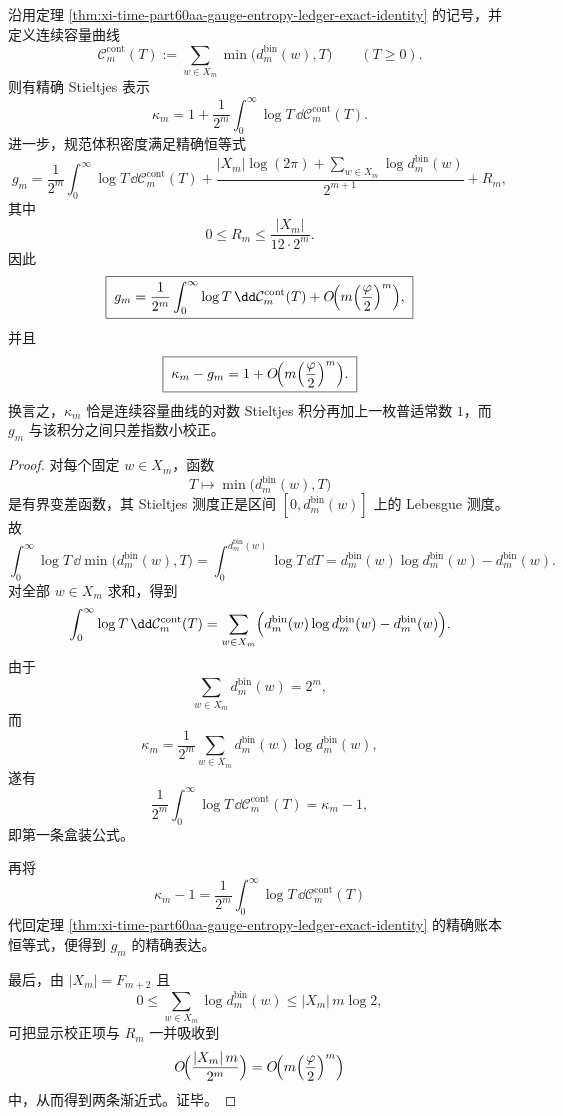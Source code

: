 \begin{theorem}\label{thm:xi-time-part60aa-log-stieltjes-capacity-gauge-density}
沿用定理 \ref{thm:xi-time-part60aa-gauge-entropy-ledger-exact-identity} 的记号，并定义连续容量曲线
\[
\mathcal C_m^{\mathrm{cont}}(T):=\sum_{w\in X_m}\min\bigl(d_m^{\mathrm{bin}}(w),T\bigr)
\qquad(T\ge 0).
\]
则有精确 Stieltjes 表示
\[
\boxed{\;
\kappa_m
=
1+\frac{1}{2^m}\int_0^\infty \log T\,\dd \mathcal C_m^{\mathrm{cont}}(T).\;}
\]
进一步，规范体积密度满足精确恒等式
\[
\boxed{\;
g_m
=
\frac{1}{2^m}\int_0^\infty \log T\,\dd \mathcal C_m^{\mathrm{cont}}(T)
+\frac{|X_m|\log(2\pi)+\sum_{w\in X_m}\log d_m^{\mathrm{bin}}(w)}{2^{m+1}}
+R_m,\;}
\]
其中
\[
0\le R_m\le \frac{|X_m|}{12\cdot 2^m}.
\]
因此
\[
\boxed{\;
g_m
=
\frac{1}{2^m}\int_0^\infty \log T\,\dd \mathcal C_m^{\mathrm{cont}}(T)
+O\!\Bigl(m\Bigl(\frac{\varphi}{2}\Bigr)^m\Bigr),\;}
\]
并且
\[
\boxed{\;
\kappa_m-g_m
=
1+O\!\Bigl(m\Bigl(\frac{\varphi}{2}\Bigr)^m\Bigr).\;}
\]
换言之，\(\kappa_m\) 恰是连续容量曲线的对数 Stieltjes 积分再加上一枚普适常数 \(1\)，而 \(g_m\) 与该积分之间只差指数小校正。
\end{theorem}
\begin{proof}
对每个固定 \(w\in X_m\)，函数
\[
T\longmapsto \min\bigl(d_m^{\mathrm{bin}}(w),T\bigr)
\]
是有界变差函数，其 Stieltjes 测度正是区间 \([0,d_m^{\mathrm{bin}}(w)]\) 上的 Lebesgue 测度。故
\[
\int_0^\infty \log T\,\dd\min\bigl(d_m^{\mathrm{bin}}(w),T\bigr)
=
\int_0^{d_m^{\mathrm{bin}}(w)}\log T\,\dd T
=
d_m^{\mathrm{bin}}(w)\log d_m^{\mathrm{bin}}(w)-d_m^{\mathrm{bin}}(w).
\]
对全部 \(w\in X_m\) 求和，得到
\[
\int_0^\infty \log T\,\dd\mathcal C_m^{\mathrm{cont}}(T)
=
\sum_{w\in X_m}
\Bigl(
d_m^{\mathrm{bin}}(w)\log d_m^{\mathrm{bin}}(w)-d_m^{\mathrm{bin}}(w)
\Bigr).
\]
由于
\[
\sum_{w\in X_m}d_m^{\mathrm{bin}}(w)=2^m,
\]
而
\[
\kappa_m=\frac{1}{2^m}\sum_{w\in X_m}d_m^{\mathrm{bin}}(w)\log d_m^{\mathrm{bin}}(w),
\]
遂有
\[
\frac{1}{2^m}\int_0^\infty \log T\,\dd\mathcal C_m^{\mathrm{cont}}(T)=\kappa_m-1,
\]
即第一条盒装公式。

再将
\[
\kappa_m-1=\frac{1}{2^m}\int_0^\infty \log T\,\dd\mathcal C_m^{\mathrm{cont}}(T)
\]
代回定理 \ref{thm:xi-time-part60aa-gauge-entropy-ledger-exact-identity} 的精确账本恒等式，便得到 \(g_m\) 的精确表达。

最后，由 \(|X_m|=F_{m+2}\) 且
\[
0\le \sum_{w\in X_m}\log d_m^{\mathrm{bin}}(w)\le |X_m|\,m\log 2,
\]
可把显示校正项与 \(R_m\) 一并吸收到
\[
O\!\Bigl(\frac{|X_m|\,m}{2^m}\Bigr)
=
O\!\Bigl(m\Bigl(\frac{\varphi}{2}\Bigr)^m\Bigr)
\]
中，从而得到两条渐近式。证毕。
\end{proof}

